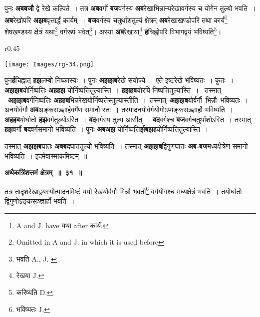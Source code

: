 \documentclass[11pt, openany]{book}
\begin{document}
 पुनः \textbf{अबबजौ} द्वे रेखे कल्पिते~। तत्र \textbf{अब}वर्गो \textbf{बज}वर्गस्य \textbf{अब}रेखाभिन्नान्यरेखावर्गस्य च योगेन तुल्यो भवति~। \textbf{अब}रेखोपरि \textbf{अझब}वृत्तार्द्धं कार्यम्~। \textbf{बज}वर्गस्य चतुर्थांशतुल्यं क्षेत्रम् \textbf{अब}रेखाखण्डोपरि तथा कार्यं\renewcommand{\thefootnote}{२}\footnote{{\en A and J. have} यथा {\en after} कार्यं.} शेषखण्डस्य क्षेत्रं यथा\renewcommand{\thefootnote}{३}\footnote{{\en Omitted in A and J. in which it is used before}} वर्गरूपं भवेत्\renewcommand{\thefootnote}{४}\footnote{भवति {\en A., J. }}\;। अस्या \textbf{अब}रेखाया\renewcommand{\thefootnote}{५}\footnote{रेखया {\en J.}} \textbf{ह}चिह्नोपरि विभागद्वयं भविष्यति\renewcommand{\thefootnote}{६}\footnote{करिष्यति {\en D.}}\;।\\

\begin{wrapfigure}{r}{0.45\textwidth}
\vspace{-10mm}
\begin{center}
\texttt{[image: Images/rg-34.png]}
\end{center}
\vspace{-8mm}
\end{wrapfigure}

पुन\textbf{र्ह}चिह्नात् \textbf{हझ}लम्बो निष्कास्यः~। पुनः \textbf{अझझब}रेखे संयोज्ये~। एते इष्टरेखे भविष्यतः~। कुतः~। \textbf{अझझब}योर्निष्पत्तिः \textbf{अहहझ}-योर्निष्पत्तितुल्यास्ति~। \textbf{हझहब}योरपि निष्पत्तितुल्यास्ति~। ~तस्मात् ~\textbf{अझझब}वर्गनिष्पत्तिः \textbf{अहहब}भिन्नरेखयोर्निष्पत्तेस्तुल्यास्तीति~। \,तस्मात् \,\textbf{अझझब}योर्वर्गौ \,भिन्नौ \,भविष्यतः~। अनयोर्वर्गौ \;\textbf{अब}अङ्कसञ्ज्ञार्हवर्गेण \;समानौ \;स्तः~। \;तस्मादनयोर्वर्गयोगोऽप्यङ्कसञ्ज्ञार्हो भविष्यति~। \textbf{अहहब}योर्घातो \textbf{हझ}वर्गतुल्योऽस्ति~। \textbf{बद}वर्गस्य तुल्य आसीत्~। \textbf{बद}वर्गश्च \textbf{बज}वर्गचतुर्थांशोऽस्ति~। तस्मात् \textbf{हझ}वर्गो \textbf{बद}वर्गसमानो  भविष्यति~। पुनः \textbf{अबअझ}-योर्निष्पत्ति\textbf{र्झबझह}योर्निष्पत्तितुल्यास्ति~। 

\newpage
\noindent तस्मात् \textbf{अझझब}घातः \textbf{अबबद}घाततुल्यो भविष्यति~। तस्मात् \textbf{अझझब}द्विगुणघातः \textbf{अब-बज}मध्यक्षेत्रेण समानो भविष्यति~। इदमेवास्माकमिष्टम्~॥ 
\vspace{2mm}

\begin{center}
\textbf{\large अथैकत्रिंशत्तमं क्षेत्रम्~॥~३१~॥}
\end{center}

{\ab तत्र तादृशरेखाद्वयस्योत्पादनमिष्टं ययो रेखयोर्वर्गौ भिन्नौ 
भवतो\renewcommand{\thefootnote}{१}\footnote{भविष्यतः {\en J.}} वर्गयोगश्च मध्यक्षेत्रं भवति~। तयोर्घातो द्विगुणोऽङ्कसञ्ज्ञार्हो भवति~।}\\
\end{document}
